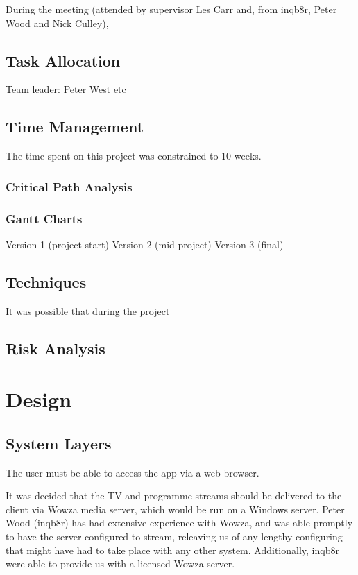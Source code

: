 \documentclass[12pt,a4paper,twoside, titlepage, openright, cleardoublepage=empty]{article}
\begin{document}
During the meeting (attended by supervisor Les Carr and, from inqb8r, Peter Wood and Nick Culley),

\subsection{Task Allocation}
Team leader: Peter West
etc

\subsection{Time Management}
The time spent on this project was constrained to 10 weeks.

\subsubsection{Critical Path Analysis}

\subsubsection{Gantt Charts}
Version 1 (project start)
Version 2 (mid project)
Version 3 (final)

\subsection{Techniques}
It was possible that during the project

\subsection{Risk Analysis}

\cleardoublepage

\section{Design}

\subsection{System Layers}
The user must be able to access the app via a web browser.

It was decided that the TV and programme streams should be delivered to the client via Wowza media server, which would be run on a Windows server. Peter Wood (inqb8r) has had extensive experience with Wowza, and was able promptly to have the server configured to stream, releaving us of any lengthy configuring that might have had to take place with any other system. Additionally, inqb8r were able to provide us with a licensed Wowza server.
\end{document}
